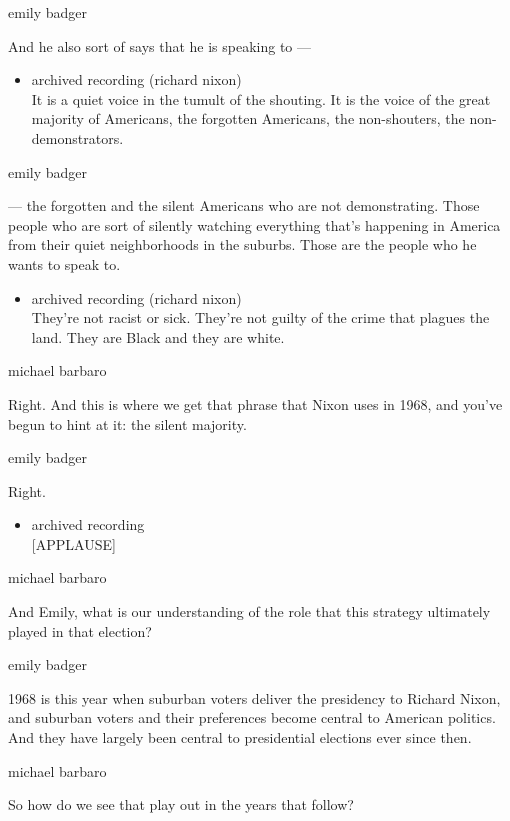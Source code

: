 emily badger

And he also sort of says that he is speaking to ---

\begin{itemize}
\tightlist
\item
  archived recording (richard nixon)\\
  It is a quiet voice in the tumult of the shouting. It is the voice of
  the great majority of Americans, the forgotten Americans, the
  non-shouters, the non-demonstrators.
\end{itemize}

emily badger

--- the forgotten and the silent Americans who are not demonstrating.
Those people who are sort of silently watching everything that's
happening in America from their quiet neighborhoods in the suburbs.
Those are the people who he wants to speak to.

\begin{itemize}
\tightlist
\item
  archived recording (richard nixon)\\
  They're not racist or sick. They're not guilty of the crime that
  plagues the land. They are Black and they are white.
\end{itemize}

michael barbaro

Right. And this is where we get that phrase that Nixon uses in 1968, and
you've begun to hint at it: the silent majority.

emily badger

Right.

\begin{itemize}
\tightlist
\item
  archived recording\\
  {[}APPLAUSE{]}
\end{itemize}

michael barbaro

And Emily, what is our understanding of the role that this strategy
ultimately played in that election?

emily badger

1968 is this year when suburban voters deliver the presidency to Richard
Nixon, and suburban voters and their preferences become central to
American politics. And they have largely been central to presidential
elections ever since then.

michael barbaro

So how do we see that play out in the years that follow?

